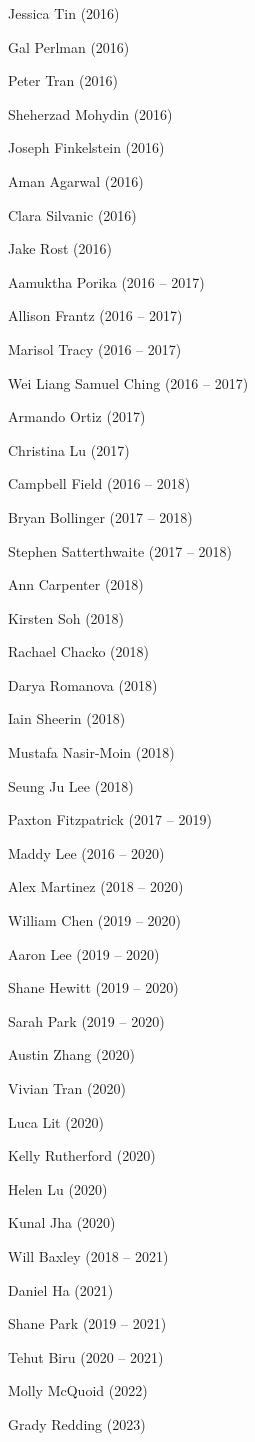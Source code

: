 \documentclass{tufte-book} %
\begin{document}
\begin{fullwidth}
\begin{multicols}{2}\raggedcolumns
\begin{list}{\quad}{}
\item Jessica Tin (2016)
\item Gal Perlman (2016)
\item Peter Tran (2016)
\item Sheherzad Mohydin (2016)
\item Joseph Finkelstein (2016)
\item Aman Agarwal (2016)
\item Clara Silvanic (2016)
\item Jake Rost (2016)
\item Aamuktha Porika (2016 -- 2017)
\item Allison Frantz (2016 -- 2017)
\item Marisol Tracy (2016 -- 2017)
\item Wei Liang Samuel Ching (2016 -- 2017)
\item Armando Ortiz (2017)
\item Christina Lu (2017)
\item Campbell Field (2016 -- 2018)
\item Bryan Bollinger (2017 -- 2018)
\item Stephen Satterthwaite (2017 -- 2018)
\item Ann Carpenter (2018)
\item Kirsten Soh (2018)
\item Rachael Chacko (2018)
\item Darya Romanova (2018)
\item Iain Sheerin (2018)
\item Mustafa Nasir-Moin (2018)
\item Seung Ju Lee (2018)
\item Paxton Fitzpatrick (2017 -- 2019)
\item Maddy Lee (2016 -- 2020)
\item Alex Martinez (2018 -- 2020)
\item William Chen (2019 -- 2020)
\item Aaron Lee (2019 -- 2020)
\item Shane Hewitt (2019 -- 2020)
\item Sarah Park (2019 -- 2020)
\item Austin Zhang (2020)
\item Vivian Tran (2020)
\item Luca Lit (2020)
\item Kelly Rutherford (2020)
\item Helen Lu (2020)
\item Kunal Jha (2020)
\item Will Baxley (2018 -- 2021)
\item Daniel Ha (2021)
\item Shane Park (2019 -- 2021)
\item Tehut Biru (2020 -- 2021)
\item Molly McQuoid (2022)
\item Grady Redding (2023)


\end{list}
\end{multicols}
\end{fullwidth}
\end{document}
